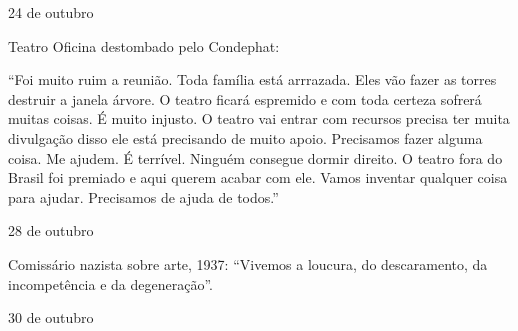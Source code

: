 \begin{flushright}
24 de outubro
\end{flushright}

Teatro Oficina destombado pelo Condephat:

``Foi muito ruim a reunião. Toda família está arrrazada. Eles vão fazer
as torres destruir a janela árvore. O teatro ficará espremido e com toda
certeza sofrerá muitas coisas. É muito injusto. O teatro vai entrar com
recursos precisa ter muita divulgação disso ele está precisando de muito
apoio. Precisamos fazer alguma coisa. Me ajudem. É terrível. Ninguém
consegue dormir direito. O teatro fora do Brasil foi premiado e aqui
querem acabar com ele. Vamos inventar qualquer coisa para ajudar.
Precisamos de ajuda de todos.''

\begin{flushright}
28 de outubro
\end{flushright}

Comissário nazista sobre arte, 1937: ``Vivemos a loucura, do
descaramento, da incompetência e da degeneração''.

\begin{flushright}
30 de outubro
\end{flushright}

